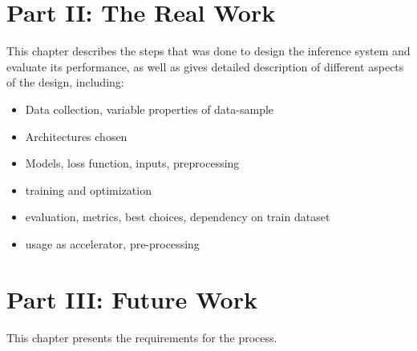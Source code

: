 \section*{Part II: The Real Work}

  \vspace{1mm}

\noindent  This chapter describes the steps that was done to design the inference system and evaluate its performance, as well as gives detailed description of different aspects of the design, including: 
	\begin{itemize}
		\item Data collection, variable properties of data-sample
		\item Architectures chosen
		\item Models, loss function, inputs, preprocessing
		\item training and optimization
		\item evaluation, metrics, best choices, dependency on train dataset
		\item usage as accelerator, pre-processing
	\end{itemize}

\section*{Part III: Future Work}

  \vspace{1mm}

\noindent  This chapter presents the requirements for the process.
